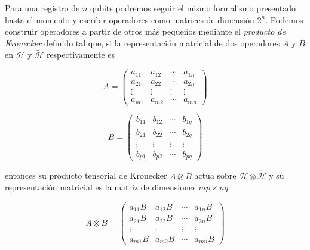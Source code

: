 \documentclass[11pt, spanish]{report}
\numberwithin{equation}{section}
\numberwithin{defin}{section}
\begin{document}
Para una registro de $n$ qubits podremos seguir el mismo formalismo presentado hasta el momento y escribir operadores como matrices de dimensión $2^n$. Podemos construir operadores a partir de otros más pequeños mediante el \emph{producto de Kronecker} definido tal	 que, si la representación matricial de dos operadores $A$ y $B$ en $\mathcal{H}$ y $\tilde{\mathcal{H}}$ respectivamente es\\

\noindent\begin{minipage}{.5\linewidth}
\begin{equation*}
A=\begin{pmatrix}
a_{11} & a_{12} & \cdots & a_{1n} \\
a_{21} & a_{22} & \cdots & a_{2n} \\
\vdots & \vdots & \vdots & \vdots \\
a_{m1} & a_{m2} & \cdots & a_{mn}
\end{pmatrix}
\end{equation*}
\end{minipage}%
\begin{minipage}{.5\linewidth}
\begin{equation}
B=\begin{pmatrix}
b_{11} & b_{12} & \cdots & b_{1q} \\
b_{21} & b_{22} & \cdots & b_{2q} \\
\vdots & \vdots & \vdots & \vdots \\
b_{p1} & b_{p2} & \cdots & b_{pq}
\end{pmatrix}
\end{equation}
\end{minipage}
\vspace{0.3cm}

\noindent entonces su producto tensorial de Kronecker $A\otimes B$ actúa sobre $\mathcal{H}\otimes\tilde{\mathcal{H}}$ y su representación matricial\footnotemark{} es la matriz de dimensiones $mp\times nq$

\begin{equation}
A\otimes B =\begin{pmatrix}
a_{11}B & a_{12}B & \cdots & a_{1n}B \\
a_{21}B & a_{22}B & \cdots & a_{2n}B \\
\vdots & \vdots & \vdots & \vdots \\
a_{m1}B & a_{m2}B & \cdots & a_{mn}B
\end{pmatrix}
\end{equation}
\end{document}
